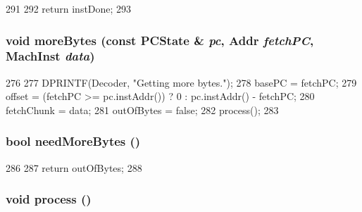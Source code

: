 \begin{DoxyCode}
291     {
292         return instDone;
293     }
\end{DoxyCode}
\hypertarget{classX86ISA_1_1Decoder_a1345d078b309b7d115c57be1ed13ae38}{
\subsubsection[{moreBytes}]{\setlength{\rightskip}{0pt plus 5cm}void moreBytes (const {\bf PCState} \& {\em pc}, \/  {\bf Addr} {\em fetchPC}, \/  {\bf MachInst} {\em data})}}
\label{classX86ISA_1_1Decoder_a1345d078b309b7d115c57be1ed13ae38}



\begin{DoxyCode}
276     {
277         DPRINTF(Decoder, "Getting more bytes.\n");
278         basePC = fetchPC;
279         offset = (fetchPC >= pc.instAddr()) ? 0 : pc.instAddr() - fetchPC;
280         fetchChunk = data;
281         outOfBytes = false;
282         process();
283     }
\end{DoxyCode}
\hypertarget{classX86ISA_1_1Decoder_a35631c47fc45b69ca30e6551f9f5d1d1}{
\subsubsection[{needMoreBytes}]{\setlength{\rightskip}{0pt plus 5cm}bool needMoreBytes ()}}
\label{classX86ISA_1_1Decoder_a35631c47fc45b69ca30e6551f9f5d1d1}



\begin{DoxyCode}
286     {
287         return outOfBytes;
288     }
\end{DoxyCode}
\hypertarget{classX86ISA_1_1Decoder_a2e9c5136d19b1a95fc427e0852deab5c}{
\subsubsection[{process}]{\setlength{\rightskip}{0pt plus 5cm}void process ()}}
\label{classX86ISA_1_1Decoder_a2e9c5136d19b1a95fc427e0852deab5c}



